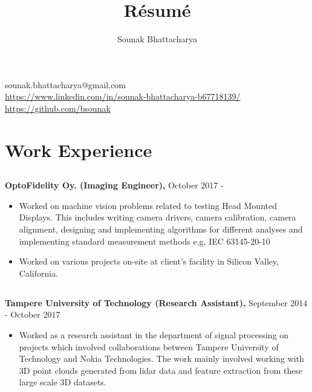 \documentclass{article}
\renewcommand{\maketitle}{
\begin{center}
{\huge\bfseries
\theauthor}

\end{center}
}
\begin{document}
\title{R\'esum\'e}
\author{Sounak Bhattacharya}

\maketitle

\begin{center}
{\Large sounak.bhattacharya@gmail.com}\\
\url{https://www.linkedin.com/in/sounak-bhattacharya-b67718139/}\\
\url{https://github.com/bsounak} 
\end{center}

\section{Work Experience}
\subsection{}
\textbf{OptoFidelity Oy. (Imaging Engineer),} October 2017 -
\begin{itemize}[label={--}]
  \itemsep0em 

  \item Worked on machine vision problems related to testing Head Mounted
    Displays.  This includes writing camera drivers, camera calibration, camera
    alignment, designing and implementing algorithms for different analyses and
    implementing standard measurement methods e.g, IEC 63145-20-10

  \item Worked on various projects on-site at client's facility in Silicon
    Valley, California.
\end{itemize}

\subsection{}
\textbf{Tampere University of Technology (Research Assistant),} September 2014 -
  October 2017
\begin{itemize}[label={--}]
  \itemsep0em 

  \item Worked as a research assistant in the department of signal processing
    on projects which involved collaborations between Tampere University of
    Technology and Nokia Technologies.  The work mainly involved working with
    3D point clouds generated from lidar data and feature extraction from these
    large scale 3D datasets.
\end{itemize}
\end{document}
